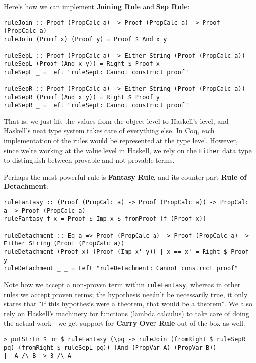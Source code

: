 \documentclass{article}
\begin{document}
Here's how we can implement \textbf{Joining Rule} and \textbf{Sep Rule}:

\begin{lstlisting}
ruleJoin :: Proof (PropCalc a) -> Proof (PropCalc a) -> Proof (PropCalc a)
ruleJoin (Proof x) (Proof y) = Proof $ And x y

ruleSepL :: Proof (PropCalc a) -> Either String (Proof (PropCalc a))
ruleSepL (Proof (And x y)) = Right $ Proof x
ruleSepL _ = Left "ruleSepL: Cannot construct proof"

ruleSepR :: Proof (PropCalc a) -> Either String (Proof (PropCalc a))
ruleSepR (Proof (And x y)) = Right $ Proof y
ruleSepR _ = Left "ruleSepL: Cannot construct proof"
\end{lstlisting}

That is, we just lift the values from the object level to Haskell's level, and Haskell's neat type system takes care of everything else. In Coq, each implementation of the rules would be represented at the type level. However, since we're working at the value level in Haskell, we rely on the \texttt{Either} data type to distinguish between provable and not provable terms. 

Perhaps the most powerful rule is \textbf{Fantasy Rule}, and its counter-part \textbf{Rule of Detachment}:

\begin{lstlisting}
ruleFantasy :: (Proof (PropCalc a) -> Proof (PropCalc a)) -> PropCalc a -> Proof (PropCalc a)
ruleFantasy f x = Proof $ Imp x $ fromProof (f (Proof x))

ruleDetachment :: Eq a => Proof (PropCalc a) -> Proof (PropCalc a) -> Either String (Proof (PropCalc a))
ruleDetachment (Proof x) (Proof (Imp x' y)) | x == x' = Right $ Proof y
ruleDetachment _ _ = Left "ruleDetachment: Cannot construct proof"
\end{lstlisting}

Note how we accept a non-proven term within \texttt{ruleFantasy}, whereas in other rules we accept proven terms; the hypothesis needn't be necessarily true, it only states that "If this hypothesis were a theorem, that would be a theorem". We also rely on Haskell's machinery for functions (lambda calculus) to take care of doing the actual work - we get support for \textbf{Carry Over Rule} out of the box as well.

\begin{lstlisting}
> putStrLn $ pr $ ruleFantasy (\pq -> ruleJoin (fromRight $ ruleSepR pq) (fromRight $ ruleSepL pq)) (And (PropVar A) (PropVar B))
|- A /\ B -> B /\ A
\end{lstlisting}
\end{document}
